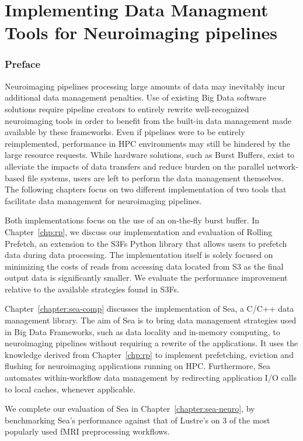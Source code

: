 \part{Implementing Data Managment Tools for Neuroimaging pipelines}
\section*{Preface}

Neuroimaging pipelines processing large amounts of data may inevitably incur
additional data management penalties. Use of existing Big Data software
solutions require pipeline creators to entirely rewrite well-recognized
neuroimaging tools in order to benefit from the built-in data management made
available by these frameworks. Even if pipelines were to be entirely
reimplemented, performance in HPC environments may still be hindered by the
large resource requests. While hardware solutions, such as Burst Buffers, exist
to alleviate the impacts of data transfers and reduce burden on the parallel
network-based file systems, users are left to perform the data management
themselves. The following chapters focus on two different implementation of two
tools that facilitate data management for neuroimaging pipelines. 

Both implementations focus on the use of an on-the-fly burst buffer. In
Chapter~\ref{chp:rp}, we discuss our implementation and evaluation of Rolling
Prefetch, an extension to the S3Fs Python library that allows users to prefetch
data during data processing. The implementation itself is solely focused on
minimizing the costs of reads from accessing data located from S3 as the final
output data is significantly smaller. We evaluate the performance improvement
relative to the available strategies found in S3Fs. 

Chapter~\ref{chapter:sea-comp} discusses the implementation of Sea, a C/C++ data
management library. The aim of Sea is to bring data management strategies used
in Big Data Frameworks, such as data locality and in-memory computing, to
neuroimaging pipelines without requiring a rewrite of the applications. It uses
the knowledge derived from Chapter~\ref{chp:rp} to implement prefetching,
eviction and flushing for neuroimaging applications running on HPC. Furthermore,
Sea automates within-workflow data management by redirecting application I/O
calls to local caches, whenever applicable. 

We complete our evaluation of Sea in Chapter~\ref{chapter:sea-neuro}, by
benchmarking Sea's performance against that of Lustre's on 3 of the most
popularly used fMRI preprocessing workflows.

